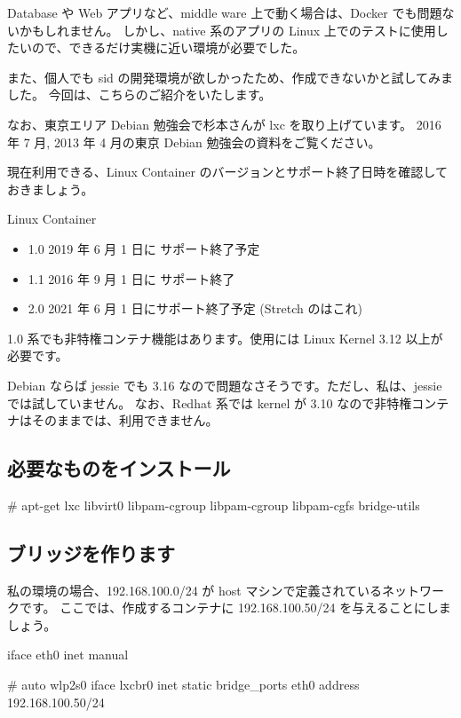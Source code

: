 \documentclass[mingoth,a4paper]{jsarticle}
\begin{document}
Database や Web アプリなど、middle ware 上で動く場合は、Docker でも問題ないかもしれません。
しかし、native 系のアプリの Linux 上でのテストに使用したいので、できるだけ実機に近い環境が必要でした。

また、個人でも sid の開発環境が欲しかったため、作成できないかと試してみました。
今回は、こちらのご紹介をいたします。

なお、東京エリア Debian 勉強会で杉本さんが lxc を取り上げています。
2016 年 7 月, 2013 年 4 月の東京 Debian 勉強会の資料をご覧ください。

現在利用できる、Linux Container のバージョンとサポート終了日時を確認しておきましょう。

Linux Container
\begin{itemize}
	\item 1.0 2019 年 6 月 1 日に サポート終了予定
	\item 1.1 2016 年 9 月 1 日に サポート終了
	\item 2.0 2021 年 6 月 1 日にサポート終了予定 (Stretch のはこれ)
\end{itemize}

1.0 系でも非特権コンテナ機能はあります。使用には Linux Kernel 3.12 以上が必要です。

Debian ならば jessie でも 3.16 なので問題なさそうです。ただし、私は、jessie では試していません。
なお、Redhat 系では kernel が 3.10 なので非特権コンテナはそのままでは、利用できません。

\subsection{必要なものをインストール}

\begin{commandline}
# apt-get lxc libvirt0 libpam-cgroup libpam-cgroup libpam-cgfs bridge-utils
\end{commandline}

\subsection{ブリッジを作ります}

私の環境の場合、192.168.100.0/24 が host マシンで定義されているネットワークです。
ここでは、作成するコンテナに 192.168.100.50/24 を与えることにしましょう。

\begin{commandline}
iface eth0 inet manual

# auto wlp2s0
iface lxcbr0 inet static
bridge_ports eth0
address 192.168.100.50/24
\end{commandline}
\end{document}
